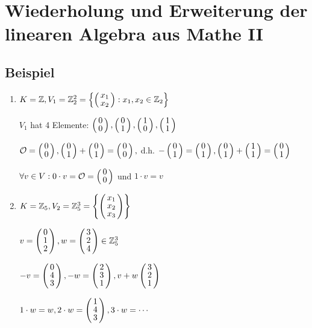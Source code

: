 \section{Wiederholung und Erweiterung der linearen Algebra aus Mathe II}

\subsection{Beispiel}

\begin{enumerate}
	\item
	$ K = \Z , V_1= \Z_2^2=\aset{
	\vct{x_1 \\ x_2} : x_1, x_2 \in \Z_2}$

	$V_1$ hat 4 Elemente: $
	\vct{0 \\0},\vct{0 \\ 1},\vct{1 \\ 0},\vct{1 \\ 1}$
	
	$\zerovec= \vct{0 \\ 0}, \vct{0 \\ 1} + \vct{0 \\ 1}= \vct{0 \\ 0},$ d.h. $-\vct{0 \\ 1} = \vct{0 \\ 1}, \vct{0 \\ 1} + \vct{1 \\ 1}=\vct{0 \\ 1}$
	 
	$\forall v \in V: 0 \cdot v = \zerovec = \vct{0 \\ 0}$ und $1\cdot v = v$
	\item
	$K = \Z_5, V_2=\Z_5^3=\aset{\vct{x_1 \\ x_2 \\ x_3}}$
	
	$v=\vct{0 \\ 1\\ 2 }, w = \vct{3 \\ 2 \\ 4} \in \Z_5^3$
	
	$-v= \vct{0 \\ 4 \\ 3}, -w = \vct{2 \\ 3 \\ 1}, v + w  \vct{3 \\ 2 \\ 1} $
	
	$1 \cdot w = w, 2 \cdot w = \vct{1 \\ 4 \\ 3}, 3 \cdot w = \cdots$
	

\end{enumerate}
